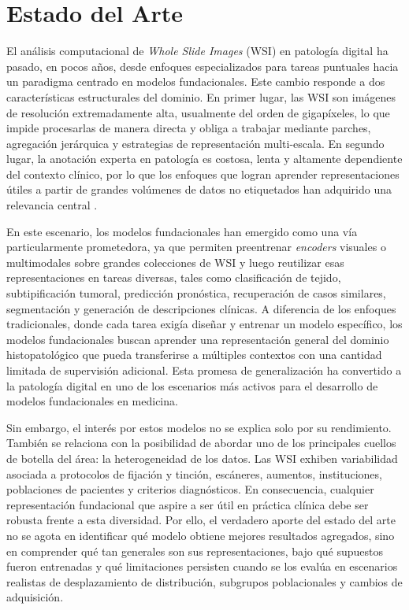 \chapter{Estado del Arte}

El análisis computacional de \textit{Whole Slide Images} (WSI) en patología digital ha pasado, en pocos años, desde enfoques especializados para tareas puntuales hacia un paradigma centrado en modelos fundacionales. Este cambio responde a dos características estructurales del dominio. En primer lugar, las WSI son imágenes de resolución extremadamente alta, usualmente del orden de gigapíxeles, lo que impide procesarlas de manera directa y obliga a trabajar mediante parches, agregación jerárquica y estrategias de representación multi-escala. En segundo lugar, la anotación experta en patología es costosa, lenta y altamente dependiente del contexto clínico, por lo que los enfoques que logran aprender representaciones útiles a partir de grandes volúmenes de datos no etiquetados han adquirido una relevancia central \parencite{Basak2023}.

En este escenario, los modelos fundacionales han emergido como una vía particularmente prometedora, ya que permiten preentrenar \textit{encoders} visuales o multimodales sobre grandes colecciones de WSI y luego reutilizar esas representaciones en tareas diversas, tales como clasificación de tejido, subtipificación tumoral, predicción pronóstica, recuperación de casos similares, segmentación y generación de descripciones clínicas. A diferencia de los enfoques tradicionales, donde cada tarea exigía diseñar y entrenar un modelo específico, los modelos fundacionales buscan aprender una representación general del dominio histopatológico que pueda transferirse a múltiples contextos con una cantidad limitada de supervisión adicional. Esta promesa de generalización ha convertido a la patología digital en uno de los escenarios más activos para el desarrollo de modelos fundacionales en medicina.

Sin embargo, el interés por estos modelos no se explica solo por su rendimiento. También se relaciona con la posibilidad de abordar uno de los principales cuellos de botella del área: la heterogeneidad de los datos. Las WSI exhiben variabilidad asociada a protocolos de fijación y tinción, escáneres, aumentos, instituciones, poblaciones de pacientes y criterios diagnósticos. En consecuencia, cualquier representación fundacional que aspire a ser útil en práctica clínica debe ser robusta frente a esta diversidad. Por ello, el verdadero aporte del estado del arte no se agota en identificar qué modelo obtiene mejores resultados agregados, sino en comprender qué tan generales son sus representaciones, bajo qué supuestos fueron entrenadas y qué limitaciones persisten cuando se los evalúa en escenarios realistas de desplazamiento de distribución, subgrupos poblacionales y cambios de adquisición.

